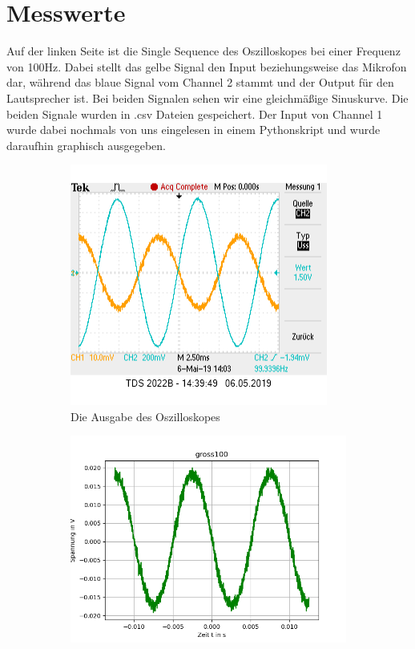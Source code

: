 \documentclass[12pt, oneside, a4paper, \docLanguage]{report}
\begin{document}
\section{Messwerte}
\label{chap:VERSUCH_2_MESSWERTE}
Auf der linken Seite ist die Single Sequence des Oszilloskopes bei einer Frequenz von 100Hz. Dabei stellt das gelbe Signal den Input beziehungsweise das Mikrofon dar, während das blaue Signal vom Channel 2 stammt und der Output für den Lautsprecher ist.
\newline 
Bei beiden Signalen sehen wir eine gleichmäßige Sinuskurve. Die beiden Signale wurden in .csv Dateien gespeichert. 
\newline 
Der Input von Channel 1 wurde dabei nochmals von uns eingelesen in einem Pythonskript und wurde daraufhin graphisch ausgegeben.
\begin{figure}[H]
\centering
\begin{subfigure}{.5\textwidth}
  \centering
  \includegraphics[width=0.9\linewidth]{../data/img/100.png}
  \caption{Die Ausgabe des Oszilloskopes}
  \label{fig:Die Ausgabe des Oszilloskopes}
\end{subfigure}%
\begin{subfigure}{.5\textwidth}
  \centering
  \includegraphics[width=0.9\linewidth]{../data/img/gross100.png}

\end{subfigure}
\end{figure}
\end{document}

